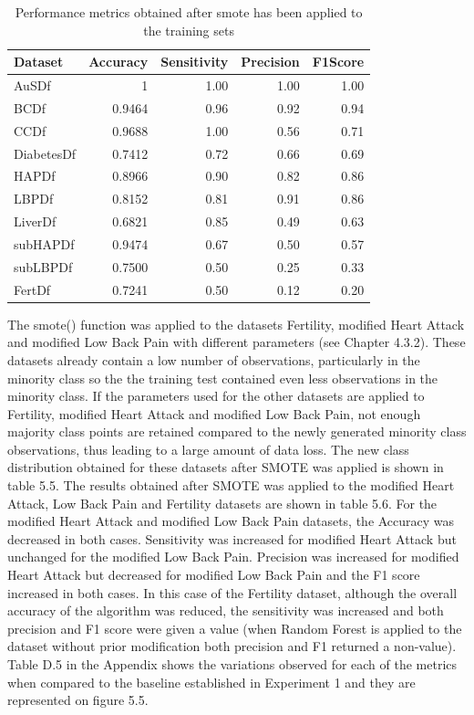 \begin{table}[!htbp]
\centering
\begin{tabular}{lrrrr}
  \hline
  \rowcolor{LightCyan}
Dataset & Accuracy & Sensitivity & Precision & F1Score \\ 
  \hline
AuSDf & 1 & 1.00 & 1.00 & 1.00 \\ 
  BCDf & 0.9464 & 0.96 & 0.92 & 0.94 \\ 
  CCDf & 0.9688 & 1.00 & 0.56 & 0.71 \\ 
  DiabetesDf & 0.7412 & 0.72 & 0.66 & 0.69 \\ 
  HAPDf & 0.8966 & 0.90 & 0.82 & 0.86 \\ 
  LBPDf & 0.8152 & 0.81 & 0.91 & 0.86 \\ 
  LiverDf & 0.6821 & 0.85 & 0.49 & 0.63 \\ 
  subHAPDf & 0.9474 & 0.67 & 0.50 & 0.57 \\ 
  subLBPDf & 0.7500 & 0.50 & 0.25 & 0.33 \\ 
  FertDf & 0.7241 & 0.50 & 0.12 & 0.20 \\ 
   \hline
\end{tabular}
\caption{Performance metrics obtained after smote has been applied to the training sets}
\end{table}

 The smote() function was applied to the datasets Fertility, modified Heart Attack and modified Low Back Pain with different parameters (see Chapter 4.3.2). These datasets already contain a low number of observations,  particularly in the minority class so the the training test contained even less observations in the minority class. If the parameters used for the other datasets are applied to Fertility, modified Heart Attack and modified Low Back Pain, not enough majority class points are retained compared to the newly generated minority class observations, thus leading to a large amount of data loss.\newline
The new class distribution obtained for these datasets after SMOTE was applied is shown in table 5.5.\newline
The results obtained after SMOTE was applied to the modified Heart Attack, Low Back Pain and Fertility datasets are shown in table 5.6.\newline
For the modified Heart Attack and modified Low Back Pain datasets, the Accuracy was decreased in both cases. Sensitivity was increased for modified Heart Attack but unchanged for the modified Low Back Pain. Precision was increased for modified Heart Attack but decreased for modified Low Back Pain and the F1 score increased in both cases.\newline
In this case of the Fertility dataset, although the overall accuracy of the algorithm was reduced, the sensitivity was increased and both precision and F1 score were given a value (when Random Forest is applied to the dataset without prior modification both precision and F1 returned a non-value).\newline
Table D.5 in the Appendix shows the variations observed for each of the metrics when compared to the baseline established in Experiment 1 and they are represented on figure 5.5.\newline

